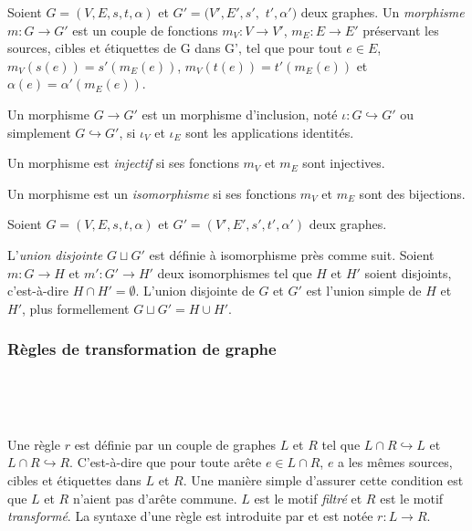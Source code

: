 \begin{definition}[Morphisme]
	Soient $G = (V,E,s,t,\alpha)$
	et $G' = (V',E',s',$ $t',\alpha')$ deux graphes.
	Un \emph{morphisme}  $m: G \to G'$  est un couple de fonctions $m_{V} : V \to V'$,
	$m_{E} : E \to E'$ préservant les sources, cibles et étiquettes de G
	dans G', tel que pour tout $e \in E$, $m_{V}(s(e)) = s'(m_{E}(e))$,
	$m_{V}(t(e)) = t'(m_{E}(e))$ et $\alpha(e) = \alpha'(m_{E}(e))$.

	Un morphisme $G \to G'$ est un morphisme d'inclusion, noté $\iota : G \hookrightarrow G'$ ou simplement $G \hookrightarrow G'$, si $\iota_{V}$ et $\iota_{E}$ sont les applications identités.

	Un morphisme est \emph{injectif} si ses fonctions $m_{V}$ et $m_{E}$ sont
	injectives.

	Un morphisme est un \emph{isomorphisme} si ses fonctions $m_{V}$ et $m_{E}$ sont des bijections.
\end{definition}


\begin{definition}
	Soient $G = (V,E,s,t,\alpha)$ et $G'=(V',E',s',t',\alpha')$ deux graphes.

	L'\emph{union disjointe} $G \sqcup G'$ est définie à isomorphisme près comme suit.
	Soient $m : G \to H$ et $m' : G' \to H'$ deux isomorphismes tel que $H$ et $H'$ soient disjoints, c'est-à-dire $H \cap H' = \emptyset$.
	L'union disjointe de  $G$ et $G'$ est l'union simple de $H$ et $H'$, plus formellement $G \sqcup G' = H \cup H'$.
\end{definition}


\subsubsection[Règles de transformation de graphe]{Règles de transformation de graphe}
\label{sec:etat-art-jerboa-regles-transformation}

~


~

Une règle $r$ est définie par un couple de graphes $L$ et $R$ tel que $L \cap R \hookrightarrow L$ et $L \cap R \hookrightarrow R$.
C'est-à-dire que pour toute arête $e \in L \cap R$, $e$ a les mêmes sources, cibles et étiquettes dans $L$ et $R$.
Une manière simple d'assurer cette condition est que $L$ et $R$ n'aient pas d'arête commune.
$L$ est le motif \emph{filtré} et $R$ est le motif \emph{transformé}. La syntaxe d'une
règle est introduite par \cite{poudr2009} et est notée $r: L \longrightarrow R$.


